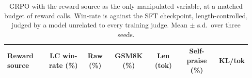 \begin{table}[t]\centering\small
\caption{GRPO with the reward source as the only manipulated variable, at a matched budget of reward calls. Win-rate is against the SFT checkpoint, length-controlled, judged by a model unrelated to every training judge. Mean $\pm$ s.d.\ over three seeds.}
\label{tab:grpo}
\begin{tabular}{lcccccc}
\toprule
Reward source & LC win-rate (\%) & Raw (\%) & GSM8K (\%) & Len (tok) & Self-praise (\%) & KL/tok \\
\midrule

\bottomrule
\end{tabular}
\end{table}
